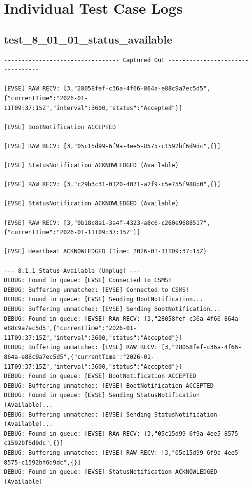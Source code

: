 \documentclass{article}
\begin{document}
\section{Individual Test Case Logs}\subsection*{test\_8\_01\_01\_status\_available}
\begin{lstlisting}
--------------------------------- Captured Out ---------------------------------

[EVSE] RAW RECV: [3,"28058fef-c36a-4f66-864a-e88c9a7ec5d5",{"currentTime":"2026-01-11T09:37:15Z","interval":3600,"status":"Accepted"}]

[EVSE] BootNotification ACCEPTED

[EVSE] RAW RECV: [3,"05c15d99-6f9a-4ee5-8575-c1592bf6d9dc",{}]

[EVSE] StatusNotification ACKNOWLEDGED (Available)

[EVSE] RAW RECV: [3,"c29b3c31-0120-4071-a2f9-c5e755f988b0",{}]

[EVSE] StatusNotification ACKNOWLEDGED (Available)

[EVSE] RAW RECV: [3,"0b18c8a1-3a4f-4323-a8c6-c260e9688517",{"currentTime":"2026-01-11T09:37:15Z"}]

[EVSE] Heartbeat ACKNOWLEDGED (Time: 2026-01-11T09:37:15Z)

--- 8.1.1 Status Available (Unplug) ---
DEBUG: Found in queue: [EVSE] Connected to CSMS!
DEBUG: Buffering unmatched: [EVSE] Connected to CSMS!
DEBUG: Found in queue: [EVSE] Sending BootNotification...
DEBUG: Buffering unmatched: [EVSE] Sending BootNotification...
DEBUG: Found in queue: [EVSE] RAW RECV: [3,"28058fef-c36a-4f66-864a-e88c9a7ec5d5",{"currentTime":"2026-01-11T09:37:15Z","interval":3600,"status":"Accepted"}]
DEBUG: Buffering unmatched: [EVSE] RAW RECV: [3,"28058fef-c36a-4f66-864a-e88c9a7ec5d5",{"currentTime":"2026-01-11T09:37:15Z","interval":3600,"status":"Accepted"}]
DEBUG: Found in queue: [EVSE] BootNotification ACCEPTED
DEBUG: Buffering unmatched: [EVSE] BootNotification ACCEPTED
DEBUG: Found in queue: [EVSE] Sending StatusNotification (Available)...
DEBUG: Buffering unmatched: [EVSE] Sending StatusNotification (Available)...
DEBUG: Found in queue: [EVSE] RAW RECV: [3,"05c15d99-6f9a-4ee5-8575-c1592bf6d9dc",{}]
DEBUG: Buffering unmatched: [EVSE] RAW RECV: [3,"05c15d99-6f9a-4ee5-8575-c1592bf6d9dc",{}]
DEBUG: Found in queue: [EVSE] StatusNotification ACKNOWLEDGED (Available)
\end{lstlisting}
\end{document}
